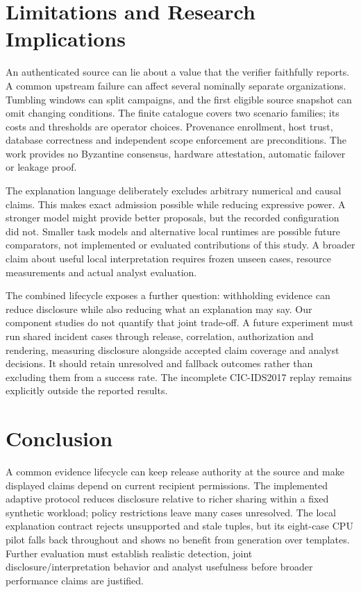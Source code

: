 \documentclass[conference,letterpaper]{IEEEtran}
\begin{document}
\section{Limitations and Research Implications}
An authenticated source can lie about a value that the verifier faithfully reports. A common upstream failure can affect several nominally separate organizations. Tumbling windows can split campaigns, and the first eligible source snapshot can omit changing conditions. The finite catalogue covers two scenario families; its costs and thresholds are operator choices. Provenance enrollment, host trust, database correctness and independent scope enforcement are preconditions. The work provides no Byzantine consensus, hardware attestation, automatic failover or leakage proof.

The explanation language deliberately excludes arbitrary numerical and causal claims. This makes exact admission possible while reducing expressive power. A stronger model might provide better proposals, but the recorded configuration did not. Smaller task models and alternative local runtimes are possible future comparators, not implemented or evaluated contributions of this study. A broader claim about useful local interpretation requires frozen unseen cases, resource measurements and actual analyst evaluation.

The combined lifecycle exposes a further question: withholding evidence can reduce disclosure while also reducing what an explanation may say. Our component studies do not quantify that joint trade-off. A future experiment must run shared incident cases through release, correlation, authorization and rendering, measuring disclosure alongside accepted claim coverage and analyst decisions. It should retain unresolved and fallback outcomes rather than excluding them from a success rate. The incomplete CIC-IDS2017 replay remains explicitly outside the reported results.

\section{Conclusion}
A common evidence lifecycle can keep release authority at the source and make displayed claims depend on current recipient permissions. The implemented adaptive protocol reduces disclosure relative to richer sharing within a fixed synthetic workload; policy restrictions leave many cases unresolved. The local explanation contract rejects unsupported and stale tuples, but its eight-case CPU pilot falls back throughout and shows no benefit from generation over templates. Further evaluation must establish realistic detection, joint disclosure/interpretation behavior and analyst usefulness before broader performance claims are justified.
\end{document}
